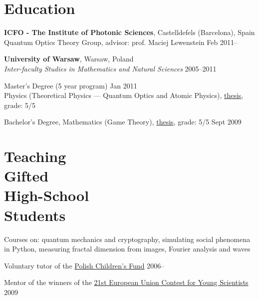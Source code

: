 \documentclass[margin,line]{resume}
\begin{document}
\begin{resume}
    \section{\mysidestyle Education}
    
    {\bf ICFO - The Institute of Photonic Sciences},  Castelldefels (Barcelona), Spain \\%
    Quantum Optics Theory Group, advisor: prof. Maciej Lewenstein \hfill { Feb 2011-- }

    {\bf University of Warsaw}, Warsaw, Poland \\
    {\sl Inter-faculty Studies in Mathematics and Natural Sciences} \hfill { 2005--2011}\\
    \begin{list2}
      \vspace*{-4mm}
      \item Master's Degree  (5 year program) \hfill { Jan 2011}\\
      Physics (Theoretical Physics --- Quantum Optics and Atomic Physics),
      \href{http://migdal.wikidot.com/en:collective-decoherence}{thesis}, grade: 5/5
      \item Bachelor's Degree, Mathematics (Game Theory),
      \href{http://migdal.wikidot.com/en:mafia}{thesis}, grade: 5/5 \hfill { Sept 2009}
    \end{list2}




    \section{\mysidestyle Teaching\\Gifted\\High-School\\Students}
    \begin{list2}
        \item Courses on: quantum mechanics and cryptography, simulating social phenomena in Python, measuring fractal dimension from images, Fourier analysis and waves
        \item Voluntary tutor of the \href{http://www.fundusz.org/?lang=gb}{Polish Children's Fund} \hfill { 2006--}
        \item Mentor of the winners of the \href{http://www.eucys09.fr/}{21st European Union Contest for Young Scientists}\hfill { 2009}
    \end{list2} 


\end{resume}
\end{document}
